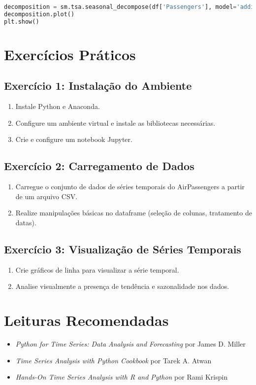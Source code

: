 \begin{lstlisting}[language=Python]
decomposition = sm.tsa.seasonal_decompose(df['Passengers'], model='additive')
decomposition.plot()
plt.show()
\end{lstlisting}

\section{Exercícios Práticos}

\subsection{Exercício 1: Instalação do Ambiente}
\begin{enumerate}
    \item Instale Python e Anaconda.
    \item Configure um ambiente virtual e instale as bibliotecas necessárias.
    \item Crie e configure um notebook Jupyter.
\end{enumerate}

\subsection{Exercício 2: Carregamento de Dados}
\begin{enumerate}
    \item Carregue o conjunto de dados de séries temporais do AirPassengers a partir de um arquivo CSV.
    \item Realize manipulações básicas no dataframe (seleção de colunas, tratamento de datas).
\end{enumerate}

\subsection{Exercício 3: Visualização de Séries Temporais}
\begin{enumerate}
    \item Crie gráficos de linha para visualizar a série temporal.
    \item Analise visualmente a presença de tendência e sazonalidade nos dados.
\end{enumerate}

\section{Leituras Recomendadas}
\begin{itemize}
    \item \textit{Python for Time Series: Data Analysis and Forecasting} por James D. Miller
    \item \textit{Time Series Analysis with Python Cookbook} por Tarek A. Atwan
    \item \textit{Hands-On Time Series Analysis with R and Python} por Rami Krispin
\end{itemize}

